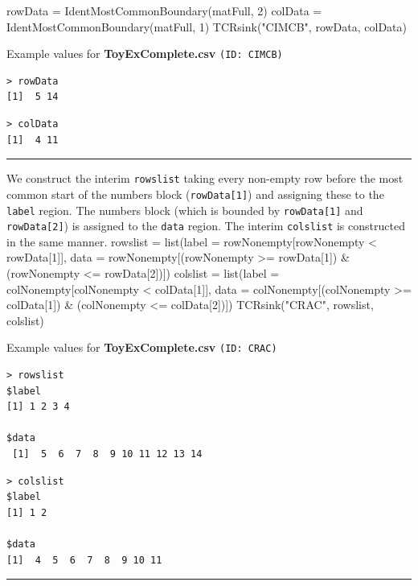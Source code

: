 \documentclass[a4paper]{article}
\begin{document}
\nwenddocs{}\endmoddef
rowData = IdentMostCommonBoundary(matFull, 2)
colData = IdentMostCommonBoundary(matFull, 1)
TCRsink("CIMCB", rowData, colData)
\nwendcode{}\nwdocspar

Example values for \textbf{ToyExComplete.csv} \texttt{(ID: CIMCB)}
\begin{verbatim}
> rowData
[1]  5 14
\end{verbatim}
\begin{verbatim}
> colData
[1]  4 11
\end{verbatim}
\vspace{-1.5em}
\noindent\rule{0.25\textwidth}{0.4pt}
\vspace{0.5em}

We construct the interim \verb|rowslist| taking every non-empty row
before the most common start of the numbers block (\verb|rowData[1]|)
and assigning these to the \verb|label| region. The numbers block
(which is bounded by \verb|rowData[1]| and \verb|rowData[2]|) is
assigned to the \verb|data| region. The interim \verb|colslist| is
constructed in the same manner.
\nwenddocs{}\endmoddef
rowslist = list(label = rowNonempty[rowNonempty < rowData[1]],
                data = rowNonempty[(rowNonempty >= rowData[1]) &
                                   (rowNonempty <= rowData[2])])
colslist = list(label = colNonempty[colNonempty < colData[1]],
                data = colNonempty[(colNonempty >= colData[1]) &
                                   (colNonempty <= colData[2])])
TCRsink("CRAC", rowslist, colslist)
\nwendcode{}\nwdocspar

Example values for \textbf{ToyExComplete.csv} \texttt{(ID: CRAC)}
\begin{verbatim}
> rowslist
$label
[1] 1 2 3 4

$data
 [1]  5  6  7  8  9 10 11 12 13 14

\end{verbatim}
\begin{verbatim}
> colslist
$label
[1] 1 2

$data
[1]  4  5  6  7  8  9 10 11

\end{verbatim}
\vspace{-1.5em}
\noindent\rule{0.25\textwidth}{0.4pt}
\vspace{0.5em}
\end{document}
